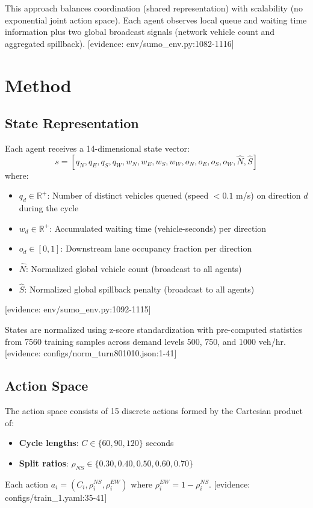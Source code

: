 This approach balances coordination (shared representation) with scalability (no exponential joint action space). Each agent observes local queue and waiting time information plus two global broadcast signals (network vehicle count and aggregated spillback).
[evidence: env/sumo\_env.py:1082-1116]


\section{Method}
\label{sec:method}

\subsection{State Representation}

Each agent receives a 14-dimensional state vector:
\begin{equation}
s = [q_N, q_E, q_S, q_W, w_N, w_E, w_S, w_W, o_N, o_E, o_S, o_W, \hat{N}, \hat{S}]
\end{equation}
where:
\begin{itemize}
    \item $q_d \in \mathbb{R}^+$: Number of distinct vehicles queued (speed $< 0.1$ m/s) on direction $d$ during the cycle
    \item $w_d \in \mathbb{R}^+$: Accumulated waiting time (vehicle-seconds) per direction
    \item $o_d \in [0,1]$: Downstream lane occupancy fraction per direction
    \item $\hat{N}$: Normalized global vehicle count (broadcast to all agents)
    \item $\hat{S}$: Normalized global spillback penalty (broadcast to all agents)
\end{itemize}
[evidence: env/sumo\_env.py:1092-1115]

States are normalized using z-score standardization with pre-computed statistics from 7560 training samples across demand levels 500, 750, and 1000 veh/hr.
[evidence: configs/norm\_turn801010.json:1-41]

\subsection{Action Space}

The action space consists of 15 discrete actions formed by the Cartesian product of:
\begin{itemize}
    \item \textbf{Cycle lengths}: $C \in \{60, 90, 120\}$ seconds
    \item \textbf{Split ratios}: $\rho_{NS} \in \{0.30, 0.40, 0.50, 0.60, 0.70\}$
\end{itemize}
Each action $a_i = (C_i, \rho_i^{NS}, \rho_i^{EW})$ where $\rho_i^{EW} = 1 - \rho_i^{NS}$.
[evidence: configs/train\_1.yaml:35-41]


